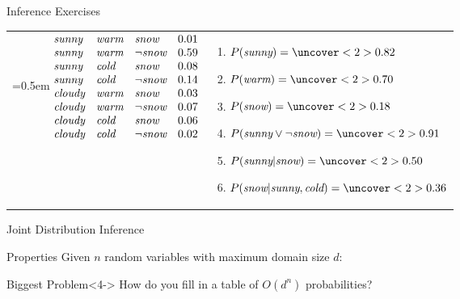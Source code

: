 \documentclass[14pt]{beamer}
\begin{document}
\begin{frame}[label=inference-exercises]{Inference Exercises}
\begin{tabular}{ @{} l m{}@{} }
\small
\arraycolsep=0.5em
$
\begin{array}{ @{} l l l l@{} }
\textit{sunny}  & \textit{warm} & \textit{snow} & 0.01 \\
\textit{sunny}  & \textit{warm} & \lnot\textit{snow} & 0.59 \\
\textit{sunny}  & \textit{cold} & \textit{snow} & 0.08 \\
\textit{sunny}  & \textit{cold} & \lnot\textit{snow} & 0.14 \\
\textit{cloudy} & \textit{warm} & \textit{snow} & 0.03 \\
\textit{cloudy} & \textit{warm} & \lnot\textit{snow} & 0.07 \\
\textit{cloudy} & \textit{cold} & \textit{snow} & 0.06 \\
\textit{cloudy} & \textit{cold} & \lnot\textit{snow} & 0.02
\end{array}
$
&
\begin{enumerate}
\item\small $P(\textit{sunny}) = \uncover<2>{0.82}$
\item\small $P(\textit{warm}) = \uncover<2>{0.70}$
\item\small $P(\textit{snow}) = \uncover<2>{0.18}$
\item\small $P(\textit{sunny} \lor \lnot\textit{snow}) = \uncover<2>{0.91}$
\item\small $P(\textit{sunny}|\textit{snow}) = \uncover<2>{0.50}$
\item\small $P(\textit{snow}|\textit{sunny},\textit{cold}) = \uncover<2>{0.36}$
\end{enumerate}
\end{tabular}
\end{frame}

\begin{frame}{Joint Distribution Inference}
\begin{block}{Properties}
Given $n$ random variables with maximum domain size $d$:
\begin{description}
\item[Time Complexity?]  
\item[Space Complexity?] 
\end{description}
\end{block}
\begin{block}{Biggest Problem}<4->
How do you fill in a table of $O(d^{n})$ probabilities?
\end{block}
\end{frame}
\end{document}
